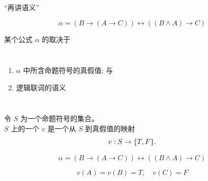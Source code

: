 
\begin{frame}{}
  \begin{center}
    {\Large ``再讲语义''}

    \vspace{0.30cm}
  \end{center}
\end{frame}

\begin{frame}{}
  \begin{center}

    \[
      \alpha = (B \to (A \to C)) \leftrightarrow ((B \land A) \to C)
    \]

    \pause
    \vspace{0.60cm}
    某个公式 $\alpha$ 的取决于
    \vspace{0.30cm}
    \begin{columns}
        \begin{enumerate}[(1)]
          \setlength{\itemsep}{6pt}
          \item $\alpha$ 中所含命题符号的真假值; 与
          \item 逻辑联词的语义
        \end{enumerate}
    \end{columns}
  \end{center}
\end{frame}

\begin{frame}{}
  \begin{definition}[真值指派 ($v$)]
    令 $S$ 为一个命题符号的集合。\\[3pt]
    $S$ 上的一个 $v$ 是一个从 $S$ 到真假值的映射
    \[
      v: S \to \{T, F\}.
    \]
  \end{definition}

  \pause
  \vspace{0.30cm}
  \[
    \alpha = (B \to (A \to C)) \leftrightarrow ((B \land A) \to C)
  \]

  \[
    v(A) = v(B) = T, \quad v(C) = F
  \]
\end{frame}

